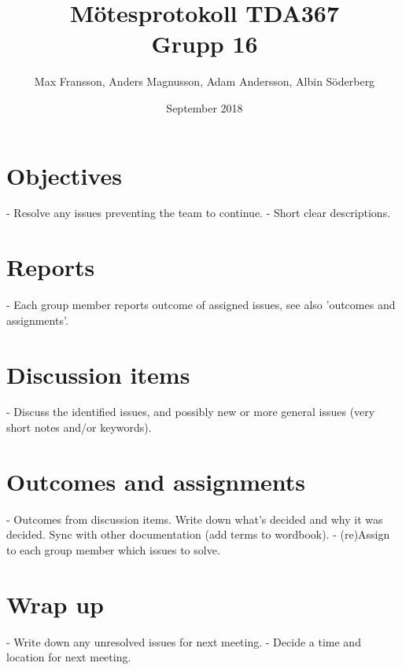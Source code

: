 \documentclass{article}
\title{%
  {Mötesprotokoll TDA367 \\
  \large Grupp 16}
  }
\author{Max Fransson, Anders Magnusson, Adam Andersson, Albin Söderberg}
\date{September 2018}
\begin{document}
\maketitle

\section{Objectives}
- Resolve any issues preventing the team to continue.
- Short clear descriptions.

\section{Reports}
- Each group member reports outcome of assigned issues, see also 'outcomes and
  assignments'.

\section{Discussion items}

- Discuss the identified issues, and possibly new or more general issues (very
  short notes and/or keywords).

\section{Outcomes and assignments}

- Outcomes from discussion items. Write down what's decided and why it was 
  decided. Sync with other documentation (add terms to wordbook).
- (re)Assign to each group member which issues to solve.

\section{Wrap up}

- Write down any unresolved issues for next meeting. 
- Decide a time and location for next meeting.



\end{document}
